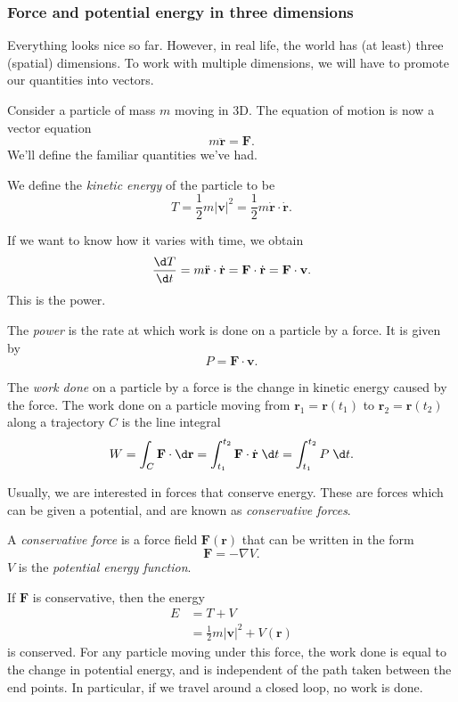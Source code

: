 \documentclass[a4paper]{article}
\begin{document}
\subsubsection*{Force and potential energy in three dimensions}
Everything looks nice so far. However, in real life, the world has (at least) three (spatial) dimensions. To work with multiple dimensions, we will have to promote our quantities into vectors.

Consider a particle of mass $m$ moving in 3D. The equation of motion is now a vector equation
\[
  m\ddot{\mathbf{r}} = \mathbf{F}.
\]
We'll define the familiar quantities we've had.
\begin{defi}
  We define the \emph{kinetic energy} of the particle to be
  \[
    T = \frac{1}{2}m|\mathbf{v}|^2 = \frac{1}{2}m\dot{\mathbf{r}}\cdot \dot{\mathbf{r}}.
  \]
\end{defi}
If we want to know how it varies with time, we obtain
\[
  \frac{\d T}{\d t} = m\ddot{\mathbf{r}}\cdot \dot{\mathbf{r}} = \mathbf{F}\cdot \dot{\mathbf{r}} = \mathbf{F}\cdot \mathbf{v}.
\]
This is the power.
\begin{defi}[Power]
  The \emph{power} is the rate at which work is done on a particle by a force. It is given by
  \[
    P = \mathbf{F}\cdot \mathbf{v}.
  \]
\end{defi}
\begin{defi}
  The \emph{work done} on a particle by a force is the change in kinetic energy caused by the force. The work done on a particle moving from $\mathbf{r}_1 = \mathbf{r}(t_1)$ to $\mathbf{r}_2 = \mathbf{r}(t_2)$ along a trajectory $C$ is the line integral
  \[
    W = \int_C \mathbf{F}\cdot\d \mathbf{r} = \int_{t_1}^{t_2} \mathbf{F}\cdot \dot{\mathbf{r}}\;\d t = \int_{t_1}^{t_2} P \;\d t.
  \]
\end{defi}
Usually, we are interested in forces that conserve energy. These are forces which can be given a potential, and are known as \emph{conservative forces}.
\begin{defi}
  A \emph{conservative force} is a force field $\mathbf{F}(\mathbf{r})$ that can be written in the form
  \[
    \mathbf{F} = -\nabla V.
  \]
  $V$ is the \emph{potential energy function}.
\end{defi}

\begin{prop}
  If $\mathbf{F}$ is conservative, then the energy
  \begin{align*}
    E &= T + V\\
    &= \frac{1}{2}m|\mathbf{v}|^2 + V(\mathbf{r})
  \end{align*}
  is conserved. For any particle moving under this force, the work done is equal to the change in potential energy, and is independent of the path taken between the end points. In particular, if we travel around a closed loop, no work is done.
\end{prop}
\end{document}
